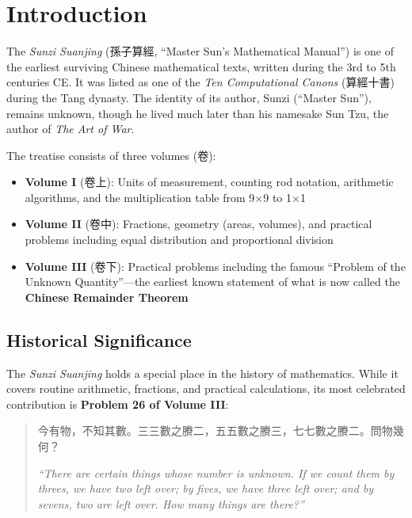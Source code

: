 \documentclass[11pt,a4paper]{article}
\newcommand{\zh}[1]{{\CJKfamily{}#1}}
\begin{document}
\tableofcontents
\newpage

\section{Introduction}

The \textit{Sunzi Suanjing} (\zh{孫子算經}, ``Master Sun's Mathematical Manual'') is one of the earliest surviving Chinese mathematical texts, written during the 3rd to 5th centuries CE. It was listed as one of the \textit{Ten Computational Canons} (\zh{算經十書}) during the Tang dynasty. The identity of its author, Sunzi (``Master Sun''), remains unknown, though he lived much later than his namesake Sun Tzu, the author of \textit{The Art of War}.

The treatise consists of three volumes (\zh{卷}):
\begin{itemize}[leftmargin=2em]
  \item \textbf{Volume I} (\zh{卷上}): Units of measurement, counting rod notation, arithmetic algorithms, and the multiplication table from 9$\times$9 to 1$\times$1
  \item \textbf{Volume II} (\zh{卷中}): Fractions, geometry (areas, volumes), and practical problems including equal distribution and proportional division
  \item \textbf{Volume III} (\zh{卷下}): Practical problems including the famous ``Problem of the Unknown Quantity''---the earliest known statement of what is now called the \textbf{Chinese Remainder Theorem}
\end{itemize}

\subsection*{Historical Significance}

The \textit{Sunzi Suanjing} holds a special place in the history of mathematics. While it covers routine arithmetic, fractions, and practical calculations, its most celebrated contribution is \textbf{Problem 26 of Volume III}:

\begin{quote}
\zh{今有物，不知其數。三三數之賸二，五五數之賸三，七七數之賸二。問物幾何？}

\textit{``There are certain things whose number is unknown. If we count them by threes, we have two left over; by fives, we have three left over; and by sevens, two are left over. How many things are there?''}
\end{quote}
\end{document}
